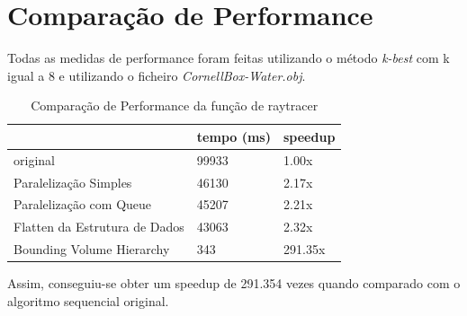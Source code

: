 \documentclass[a4paper]{report}
\begin{document}
\chapter{Comparação de Performance}

Todas as medidas de performance foram feitas utilizando o método \textit{k-best}
com k igual a 8 e utilizando o ficheiro \textit{CornellBox-Water.obj}.

\begin{table}[h]
    \centering
    \begin{tabular}{|l|l|l|}
        \hline
                                      & tempo (ms) & speedup \\ \hline
        original                      & 99933      & 1.00x \\ \hline
        Paralelização Simples         & 46130      & 2.17x \\ \hline
        Paralelização com Queue       & 45207      & 2.21x \\ \hline
        Flatten da Estrutura de Dados & 43063      & 2.32x \\ \hline
        Bounding Volume Hierarchy     & 343        & 291.35x \\ \hline
    \end{tabular}
    \caption{Comparação de Performance da função de raytracer}
\end{table}

Assim, conseguiu-se obter um speedup de 291.354 vezes quando comparado com o
algoritmo sequencial original.
\end{document}
